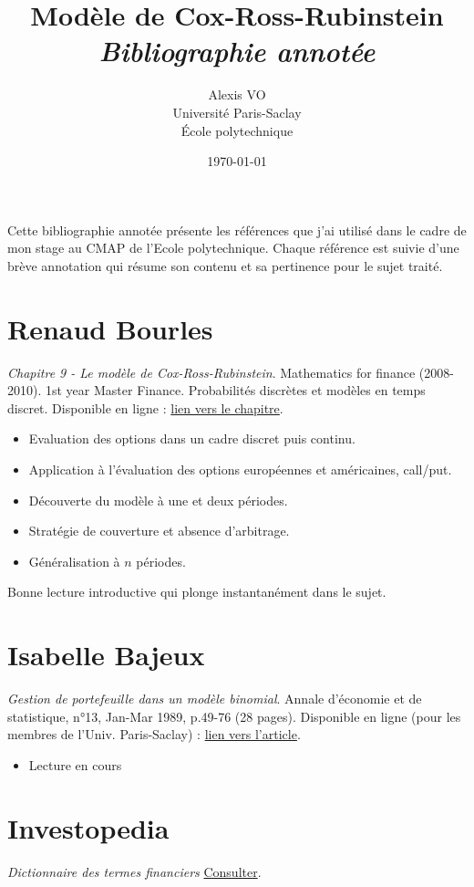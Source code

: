 \documentclass[a4paper,10pt]{article}
\title{\Huge{\textbf{Modèle de Cox-Ross-Rubinstein}}\\ \medskip
      \Huge{\textit{Bibliographie annotée}}\vspace*{0.7cm}}
\author{\LARGE{Alexis VO}\vspace{1cm}\\ \medskip
      Université Paris-Saclay\\École polytechnique}
\date{\vspace{0.2cm}\today}
\begin{document}
\vspace{\fill}
  \maketitle
\vspace{\fill}

\newpage

Cette bibliographie annotée présente les références que j'ai utilisé dans le cadre de mon stage au CMAP de l'Ecole polytechnique. Chaque référence est suivie d'une brève annotation qui résume son contenu et sa pertinence pour le sujet traité.\\ \medskip

\begin{center}
    \tableofcontents    
\end{center}

\newpage

\vspace{1em}

\section*{Renaud Bourles\quad}
{}

\textit{Chapitre 9 - Le modèle de Cox-Ross-Rubinstein}. Mathematics for finance (2008-2010). 1st year Master Finance. Probabilités discrètes et modèles en temps discret.
Disponible en ligne : \href{http://renaud.bourles.perso.centrale-med.fr/MathsFi/Chap%209%20-%20Le%20modele%20Cox-Ross-Rubinstein.pdf}{lien vers le chapitre}.
\begin{itemize}
    \item Evaluation des options dans un cadre discret puis continu.
    \item Application à l'évaluation des options européennes et américaines, call/put.
    \item Découverte du modèle à une et deux périodes.
    \item Stratégie de couverture et absence d'arbitrage.
    \item Généralisation à $n$ périodes.
\end{itemize}
Bonne lecture introductive qui plonge instantanément dans le sujet.\\ 

\vspace{1em}

\section*{Isabelle Bajeux}
{}
\textit{Gestion de portefeuille dans un modèle binomial}. Annale d'économie et de statistique, n°13, Jan-Mar 1989, p.49-76 (28 pages).
Disponible en ligne (pour les membres de l'Univ. Paris-Saclay) : \href{https://www.jstor.org/stable/20075729}{lien vers l'article}.
\begin{itemize}
    \item Lecture en cours
\end{itemize}

\vspace{1em}
\section*{Investopedia}
{}
\textit{Dictionnaire des termes financiers} \href{https://www.investopedia.com/financial-term-dictionary-4769738}{Consulter}.
\end{document}

